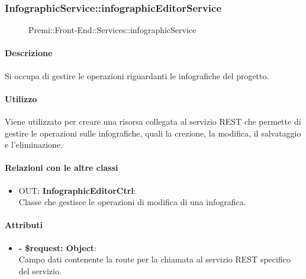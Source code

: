 		
		\subsubsection{InfographicService::infographicEditorService}
		\begin{figure}[h]
			\centering
			\caption[Premi::Front-End::Services::InfographicService]{Premi::Front-End::Services::infographicService}
		\end{figure}
		
		\paragraph{Descrizione}
		Si occupa di gestire le operazioni riguardanti le infografiche del progetto.
		
		\paragraph{Utilizzo}
		Viene utilizzato per creare una risorsa collegata al servizio REST che permette di gestire le operazioni sulle infografiche, quali la crezione, la modifica, il salvataggio e l'eliminazione.
		
		\paragraph{Relazioni con le altre classi}
		\begin{itemize}
			\item OUT: \textbf{InfographicEditorCtrl}:\\
			Classe che gestisce le operazioni di modifica di una infografica.
		\end{itemize}
		
		\paragraph{Attributi}
		\begin{itemize}
			\item \textbf{- \$request: Object}:\\
			Campo dati contenente la route per la chiamata al servizio REST specifico del servizio.
		\end{itemize}	
		

